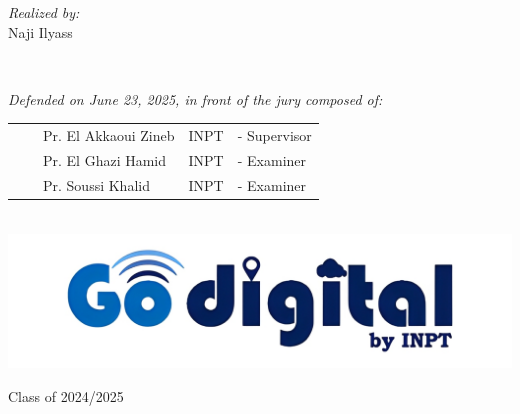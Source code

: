 \begin{titlepage}
\begin{center}
  \noindent
  \begin{minipage}{0.9\textwidth}
    \vspace{-7mm}
    \begin{flushleft} \large
      \emph{Realized by:}\\ \vspace{0.2cm}
      \hspace{0.95cm} Naji Ilyass  \\
    \end{flushleft}
  \end{minipage}
  \begin{minipage}{0.4\textwidth}
  \end{minipage}\\[1.3cm]

  \vspace{0.2cm}

  \begin{minipage}{0.9\textwidth}
    \vspace{-7mm}
    \begin{flushleft} \large
      \emph{Defended on June 23, 2025, in front of the jury composed of:}\\ \vspace{0.3cm}
      \begin{tabular}{ll  l l l}
      &&Pr. El Akkaoui Zineb & INPT  & - Supervisor \\
      &&Pr. El Ghazi Hamid & INPT  & - Examiner \\
      &&Pr. Soussi Khalid & INPT  & - Examiner \\
      \end{tabular}
    \end{flushleft}
  \end{minipage}\\[1.3cm]


  \includegraphics[scale=0.3]{Images/go digital.jpg}
  
  \vspace{1.3cm}
  {\large Class of 2024/2025}
  
  \end{center}
  \end{titlepage}
  